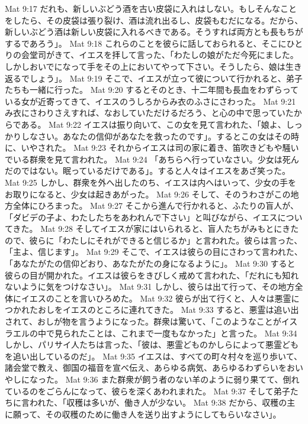 Mat 9:17  だれも、新しいぶどう酒を古い皮袋に入れはしない。もしそんなことをしたら、その皮袋は張り裂け、酒は流れ出るし、皮袋もむだになる。だから、新しいぶどう酒は新しい皮袋に入れるべきである。そうすれば両方とも長もちがするであろう」。
Mat 9:18  これらのことを彼らに話しておられると、そこにひとりの会堂司がきて、イエスを拝して言った、「わたしの娘がただ今死にました。しかしおいでになって手をその上においてやって下さい。そうしたら、娘は生き返るでしょう」。
Mat 9:19  そこで、イエスが立って彼について行かれると、弟子たちも一緒に行った。
Mat 9:20  するとそのとき、十二年間も長血をわずらっている女が近寄ってきて、イエスのうしろからみ衣のふさにさわった。
Mat 9:21  み衣にさわりさえすれば、なおしていただけるだろう、と心の中で思っていたからである。
Mat 9:22  イエスは振り向いて、この女を見て言われた、「娘よ、しっかりしなさい。あなたの信仰があなたを救ったのです」。するとこの女はその時に、いやされた。
Mat 9:23  それからイエスは司の家に着き、笛吹きどもや騒いでいる群衆を見て言われた。
Mat 9:24  「あちらへ行っていなさい。少女は死んだのではない。眠っているだけである」。すると人々はイエスをあざ笑った。
Mat 9:25  しかし、群衆を外へ出したのち、イエスは内へはいって、少女の手をお取りになると、少女は起きあがった。
Mat 9:26  そして、そのうわさがこの地方全体にひろまった。
Mat 9:27  そこから進んで行かれると、ふたりの盲人が、「ダビデの子よ、わたしたちをあわれんで下さい」と叫びながら、イエスについてきた。
Mat 9:28  そしてイエスが家にはいられると、盲人たちがみもとにきたので、彼らに「わたしにそれができると信じるか」と言われた。彼らは言った、「主よ、信じます」。
Mat 9:29  そこで、イエスは彼らの目にさわって言われた、「あなたがたの信仰どおり、あなたがたの身になるように」。
Mat 9:30  すると彼らの目が開かれた。イエスは彼らをきびしく戒めて言われた、「だれにも知れないように気をつけなさい」。
Mat 9:31  しかし、彼らは出て行って、その地方全体にイエスのことを言いひろめた。
Mat 9:32  彼らが出て行くと、人々は悪霊につかれたおしをイエスのところに連れてきた。
Mat 9:33  すると、悪霊は追い出されて、おしが物を言うようになった。群衆は驚いて、「このようなことがイスラエルの中で見られたことは、これまで一度もなかった」と言った。
Mat 9:34  しかし、パリサイ人たちは言った、「彼は、悪霊どものかしらによって悪霊どもを追い出しているのだ」。
Mat 9:35  イエスは、すべての町々村々を巡り歩いて、諸会堂で教え、御国の福音を宣べ伝え、あらゆる病気、あらゆるわずらいをおいやしになった。
Mat 9:36  また群衆が飼う者のない羊のように弱り果てて、倒れているのをごらんになって、彼らを深くあわれまれた。
Mat 9:37  そして弟子たちに言われた、「収穫は多いが、働き人が少ない。
Mat 9:38  だから、収穫の主に願って、その収穫のために働き人を送り出すようにしてもらいなさい」。
